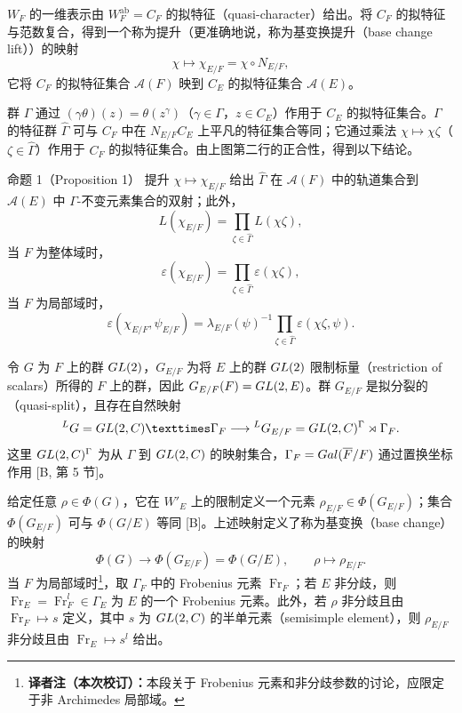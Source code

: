 $W_F$ 的一维表示由 $W_F^{\mathrm{ab}}=C_F$ 的拟特征（quasi-character）给出。将 $C_F$ 的拟特征与范数复合，得到一个称为提升（更准确地说，称为基变换提升（base change lift））的映射
\[
 \chi\longmapsto\chi_{E/F}=\chi\circ N_{E/F},
\]
它将 $C_F$ 的拟特征集合 $\mathcal A(F)$ 映到 $C_E$ 的拟特征集合 $\mathcal A(E)$。

群 $\Gamma$ 通过 $(\gamma\theta)(z)=\theta(z^\gamma)$（$\gamma\in\Gamma$，$z\in C_E$）作用于 $C_E$ 的拟特征集合。$\Gamma$ 的特征群 $\widehat\Gamma$ 可与 $C_F$ 中在 $N_{E/F}C_E$ 上平凡的特征集合等同；它通过乘法 $\chi\mapsto\chi\zeta$（$\zeta\in\widehat\Gamma$）作用于 $C_F$ 的拟特征集合。由上图第二行的正合性，得到以下结论。

\begin{originaltheorem}{命题 1（Proposition 1）}
提升 $\chi\mapsto\chi_{E/F}$ 给出 $\widehat\Gamma$ 在 $\mathcal A(F)$ 中的轨道集合到 $\mathcal A(E)$ 中 $\Gamma$-不变元素集合的双射；此外，
\[
 L(\chi_{E/F})=\prod_{\zeta\in\widehat\Gamma}L(\chi\zeta),
\]
当 $F$ 为整体域时，
\[
 \varepsilon(\chi_{E/F})=\prod_{\zeta\in\widehat\Gamma}\varepsilon(\chi\zeta),
\]
当 $F$ 为局部域时，
\[
 \varepsilon(\chi_{E/F},\psi_{E/F})
 =\lambda_{E/F}(\psi)^{-1}
 \prod_{\zeta\in\widehat\Gamma}\varepsilon(\chi\zeta,\psi).
\]
\end{originaltheorem}

令 $G$ 为 $F$ 上的群 $GL(2)$，$G_{E/F}$ 为将 $E$ 上的群 $GL(2)$ 限制标量（restriction of scalars）所得的 $F$ 上的群，因此 $G_{E/F}(F)=GL(2,E)$。群 $G_{E/F}$ 是拟分裂的（quasi-split），且存在自然映射
\[
 {}^LG=\GL(2,\C)\times\Gamma_F
 \longrightarrow{}^LG_{E/F}=\GL(2,\C)^\Gamma\rtimes\Gamma_F.
\]
这里 $GL(2,C)^\Gamma$ 为从 $\Gamma$ 到 $GL(2,C)$ 的映射集合，$\Gamma_F=Gal(\overline F/F)$ 通过置换坐标作用 [B, 第 5 节]。

给定任意 $\rho\in\Phi(G)$，它在 $W'_E$ 上的限制定义一个元素 $\rho_{E/F}\in\Phi(G_{E/F})$；集合 $\Phi(G_{E/F})$ 可与 $\Phi(G/E)$ 等同 [B]。上述映射定义了称为基变换（base change）的映射
\[
 \Phi(G)\longrightarrow\Phi(G_{E/F})=\Phi(G/E),
 \qquad\rho\longmapsto\rho_{E/F}.
\]
当 $F$ 为局部域时\footnote{\textbf{译者注（本次校订）：}本段关于 Frobenius 元素和非分歧参数的讨论，应限定于非 Archimedes 局部域。}，取 $\Gamma_F$ 中的 Frobenius 元素 $\operatorname{Fr}_F$；若 $E$ 非分歧，则 $\operatorname{Fr}_E=\operatorname{Fr}_F^l\in\Gamma_E$ 为 $E$ 的一个 Frobenius 元素。此外，若 $\rho$ 非分歧且由 $\operatorname{Fr}_F\mapsto s$ 定义，其中 $s$ 为 $GL(2,C)$ 的半单元素（semisimple element），则 $\rho_{E/F}$ 非分歧且由 $\operatorname{Fr}_E\mapsto s^l$ 给出。

